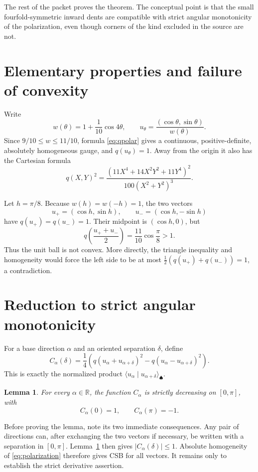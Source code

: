 \documentclass[11pt]{article}
\newtheorem{lemma}{Lemma}
\newcommand{\R}{\mathbb R}
\begin{document}
The rest of the packet proves the theorem.  The conceptual point is that the
small fourfold-symmetric inward dents are compatible with strict angular
monotonicity of the polarization, even though corners of the kind excluded in
the source are not.

\section{Elementary properties and failure of convexity}

Write
\[
 w(\theta)=1+\frac1{10}\cos4\theta,
 \qquad
 u_\theta=\frac{(\cos\theta,\sin\theta)}{w(\theta)}.
\]
Since $9/10\le w\le11/10$, formula \eqref{eq:qpolar} gives a continuous,
positive-definite, absolutely homogeneous gauge, and $q(u_\theta)=1$.  Away
from the origin it also has the Cartesian formula
\begin{equation}\label{eq:qcartesian}
 q(X,Y)^2=
 \frac{(11X^4+14X^2Y^2+11Y^4)^2}
 {100(X^2+Y^2)^3}.
\end{equation}

Let $h=\pi/8$.  Because $w(h)=w(-h)=1$, the two vectors
\[
 u_+=(\cos h,\sin h),\qquad u_-=(\cos h,-\sin h)
\]
have $q(u_+)=q(u_-)=1$.  Their midpoint is $(\cos h,0)$, but
\[
 q\!\left(\frac{u_++u_-}{2}\right)
 =\frac{11}{10}\cos\frac\pi8>1.
\]
Thus the unit ball is not convex.  More directly, the triangle inequality
and homogeneity would force the left side to be at most
$\tfrac12(q(u_+)+q(u_-))=1$, a contradiction.

\section{Reduction to strict angular monotonicity}

For a base direction $\alpha$ and an oriented separation $\delta$, define
\begin{equation}\label{eq:Cdef}
 C_\alpha(\delta)
 =\frac14\left(q(u_\alpha+u_{\alpha+\delta})^2
                -q(u_\alpha-u_{\alpha+\delta})^2\right).
\end{equation}
This is exactly the normalized product
$\langle u_\alpha\mid u_{\alpha+\delta}\rangle_\spadesuit$.

\begin{lemma}\label{lem:monotone}
For every $\alpha\in\R$, the function $C_\alpha$ is strictly decreasing on
$[0,\pi]$, with
\[
 C_\alpha(0)=1,\qquad C_\alpha(\pi)=-1.
\]
\end{lemma}

Before proving the lemma, note its two immediate consequences.  Any pair of
directions can, after exchanging the two vectors if necessary, be written
with a separation in $[0,\pi]$.  Lemma~\ref{lem:monotone} then gives
$|C_\alpha(\delta)|\le1$.  Absolute homogeneity of
\eqref{eq:polarization} therefore gives CSB for all vectors.  It remains only
to establish the strict derivative assertion.
\end{document}
